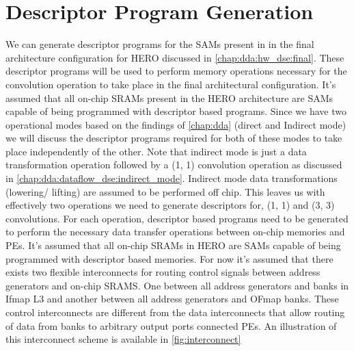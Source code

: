 
\clearpage

\section{Descriptor Program Generation}
\label{chap:sams:acc_scheduling}

We can generate descriptor programs for the SAMs present in
in the final architecture configuration for HERO discussed in \autoref{chap:dda:hw_dse:final}.
These descriptor programs will be used to perform memory operations necessary
for the convolution operation to take place in the final architectural configuration.
It's assumed that all on-chip SRAMs present in the HERO architecture are SAMs
capable of being programmed with descriptor based programs.   
Since we have two operational modes based on the findings of
\autoref{chap:dda} (direct and Indirect mode) we will discuss the
descriptor programs required for both of these modes to take place independently of
the other. Note that indirect mode is just a data transformation operation
followed by a (1, 1) convolution operation as discussed in
\autoref{chap:dda:dataflow_dse:indirect_mode}. Indirect mode data
transformations (lowering/ lifting) are assumed to be performed off chip. This leaves us
with effectively two operations we need to generate descriptors for, (1, 1) and (3, 3)
convolutions. For each operation, descriptor based programs need to be generated
to perform the necessary data transfer operations between on-chip memories and
PEs. It's assumed that all on-chip SRAMs in HERO are SAMs capable of being
programmed with descriptor based memories. 
For now it's assumed that there exists two flexible interconnects for routing
control signals between address generators and on-chip SRAMS. One between all
address generators and banks in Ifmap L3 and another between all address
generators and OFmap banks. These control interconnects are different from the
data interconnects that allow routing of data from banks to arbitrary output
ports connected PEs. An illustration of this interconnect scheme is available in
\autoref{fig:interconnect}

